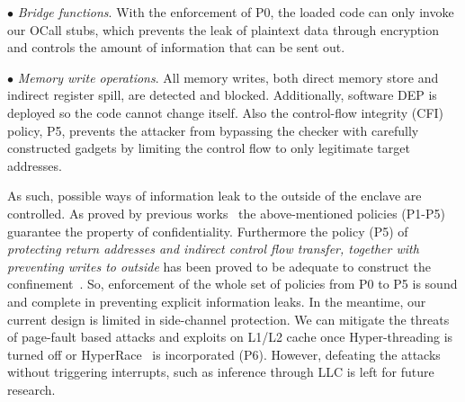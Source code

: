 \vspace{2pt}\noindent$\bullet$\textit{ Bridge functions}. 
With the enforcement of P0, the loaded code can only invoke our OCall stubs, which prevents the leak of plaintext data through encryption and controls the amount of information that can be sent out.

\vspace{2pt}\noindent$\bullet$\textit{ Memory write operations}. All memory writes, both direct memory store and indirect register spill, are detected and blocked. Additionally, software DEP is deployed so the code cannot change itself.  Also the control-flow integrity (CFI) policy, P5, prevents the attacker from bypassing the checker with carefully constructed gadgets by limiting the control flow to only legitimate target addresses. 

As such, possible ways of information leak to the outside of the enclave are controlled. As proved by previous works~\cite{sinha2015moat,sinha2016design} the above-mentioned policies (P1-P5) guarantee the property of confidentiality. Furthermore the policy (P5) of \textit{protecting return addresses and indirect control flow transfer, together with preventing writes to outside} has been proved to be adequate to construct the confinement~\cite{schuster2015vc3,sinha2016design}. So, enforcement of the whole set of policies from P0 to P5 is sound and complete in preventing explicit information leaks. 
In the meantime, our current design is limited in side-channel protection. We can mitigate the threats of page-fault based attacks and exploits on L1/L2 cache once Hyper-threading is turned off or HyperRace~\cite{chen2018racing} is incorporated (P6). However, defeating the attacks without triggering interrupts, such as inference through LLC is left for future research.  






